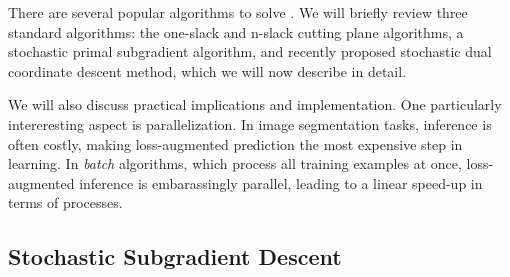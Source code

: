 There are several popular algorithms to solve . We
will briefly review three standard algorithms: the one-slack and n-slack
cutting plane algorithms, a stochastic primal subgradient algorithm, and
recently proposed stochastic dual coordinate descent method, which we
will now describe in detail.


We will also discuss practical implications and implementation.
One particularly intereresting aspect is parallelization.
In image segmentation tasks, inference is often costly, making loss-augmented
prediction the most expensive step in learning. In \emph{batch} algorithms,
which process all training examples at once, loss-augmented inference is
embarassingly parallel, leading to a linear speed-up in terms of processes.


\subsection{Stochastic Subgradient Descent}


